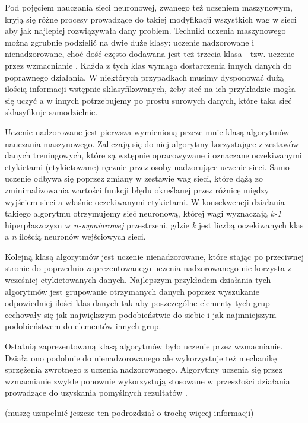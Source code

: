 \documentclass[12pt, oneside, a4paper]{report}
\begin{document}
Pod pojęciem nauczania sieci neuronowej, zwanego też uczeniem maszynowym, kryją się różne procesy prowadzące do takiej modyfikacji wszystkich wag w sieci aby jak najlepiej rozwiązywała dany problem. Techniki uczenia maszynowego można zgrubnie podzielić na dwie duże klasy: uczenie nadzorowane i nienadzorowane, choć dość często dodawana jest też trzecia klasa - tzw. uczenie przez wzmacnianie \citep{roelants2017deeplearning}. Każda z tych klas wymaga dostarczenia innych danych do poprawnego działania. W niektórych przypadkach musimy dysponować dużą ilością informacji wstępnie sklasyfikowanych, żeby sieć na ich przykładzie mogła się uczyć a w innych potrzebujemy po prostu surowych danych, które taka sieć sklasyfikuje samodzielnie.

Uczenie nadzorowane jest pierwsza wymienioną przeze mnie klasą algorytmów nauczania maszynowego. Zaliczają się do niej algorytmy korzystające z zestawów danych treningowych, które są wstępnie opracowywane i oznaczane oczekiwanymi etykietami (etykietowane) ręcznie przez osoby nadzorujące uczenie sieci. Samo uczenie odbywa się poprzez zmiany w zestawie wag sieci, które dążą zo zminimalizowania wartości funkcji błędu określanej przez różnicę między wyjściem sieci a właśnie oczekiwanymi etykietami. W konsekwencji działania takiego algorytmu otrzymujemy sieć neuronową, której wagi wyznaczają \textit{k-1} hiperpłaszczyzn w \textit{n-wymiarowej} przestrzeni, gdzie \textit{k} jest liczbą oczekiwanych klas a \textit{n} ilością neuronów wejściowych sieci.

Kolejną klasą algorytmów jest uczenie nienadzorowane, które stając po przeciwnej stronie do poprzednio zaprezentowanego uczenia nadzorowanego nie korzysta z wcześniej etykietowanych danych. Najlepszym przykładem działania tych algorytmów jest grupowanie otrzymanych danych poprzez wyszukanie odpowiedniej ilości klas danych tak aby poszczególne elementy tych grup cechowały się jak największym podobieństwie do siebie i jak najmniejszym podobieństwem do elementów innych grup.

Ostatnią zaprezentowaną klasą algorytmów było uczenie przez wzmacnianie. Działa ono podobnie do nienadzorowanego ale wykorzystuje też mechanikę sprzężenia zwrotnego z uczenia nadzorowanego. Algorytmy uczenia się przez wzmacnianie zwykle ponownie wykorzystują stosowane w przeszłości działania prowadzące do uzyskania pomyślnych rezultatów \citep{roelants2017deeplearning}.

(muszę uzupełnić jeszcze ten podrozdział o trochę więcej informacji)
\end{document}
